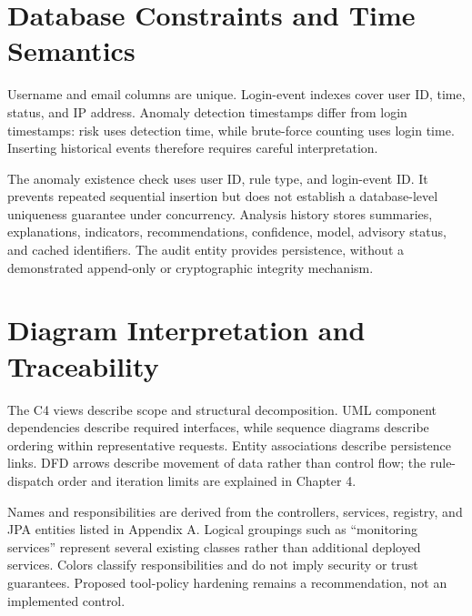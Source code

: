 

\clearpage\section{Database Constraints and Time Semantics}
Username and email columns are unique. Login-event indexes cover user ID, time, status, and IP address. Anomaly detection timestamps differ from login timestamps: risk uses detection time, while brute-force counting uses login time. Inserting historical events therefore requires careful interpretation.

The anomaly existence check uses user ID, rule type, and login-event ID. It prevents repeated sequential insertion but does not establish a database-level uniqueness guarantee under concurrency. Analysis history stores summaries, explanations, indicators, recommendations, confidence, model, advisory status, and cached identifiers. The audit entity provides persistence, without a demonstrated append-only or cryptographic integrity mechanism.

\section{Diagram Interpretation and Traceability}
The C4 views describe scope and structural decomposition. UML component dependencies describe required interfaces, while sequence diagrams describe ordering within representative requests. Entity associations describe persistence links. DFD arrows describe movement of data rather than control flow; the rule-dispatch order and iteration limits are explained in Chapter 4.

Names and responsibilities are derived from the controllers, services, registry, and JPA entities listed in Appendix A. Logical groupings such as ``monitoring services'' represent several existing classes rather than additional deployed services. Colors classify responsibilities and do not imply security or trust guarantees. Proposed tool-policy hardening remains a recommendation, not an implemented control.
